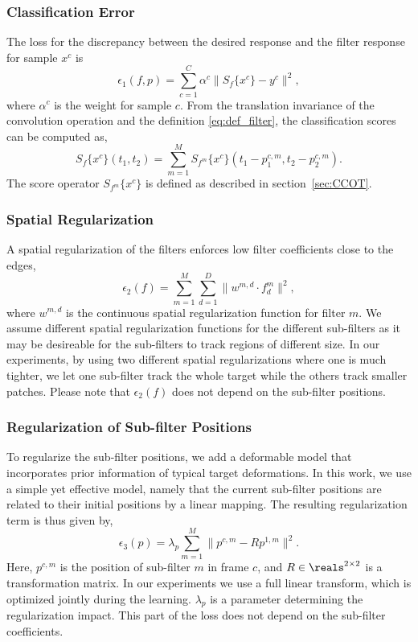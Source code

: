 \documentclass[runningheads,a4paper]{llncs}
\begin{document}
\subsubsection{Classification Error}
The loss for the discrepancy between the desired response and the filter response for sample $x^c$ is
\begin{equation}
  \epsilon_1(f,p) = \sum_{c=1}^C\alpha^c\|S_f\{x^c\} - y^c\|^2 ,
\end{equation}
where $\alpha^c$ is the weight for sample $c$. From the translation invariance of the convolution operation and the definition \eqref{eq:def_filter}, the classification scores can be computed as, 
\begin{equation}
S_f\{x^{c}\}(t_1,t_2) = \sum_{m=1}^M S_{f^m}\{x^{c}\}(t_1-p_1^{c,m},t_2-p_2^{c,m}).
\end{equation}
The score operator $S_{f^m}\{x^c\}$ is defined as described in section~\ref{sec:CCOT}.

\subsubsection{Spatial Regularization}
A spatial regularization of the filters enforces low filter coefficients close to the edges,
\begin{equation}
  \epsilon_2(f) = \sum_{m=1}^M\sum_{d=1}^D\|w^{m,d}\cdot f_d^m\|^2,
\end{equation}
where $w^{m,d}$ is the continuous spatial regularization function for filter $m$. We assume different spatial regularization functions for the different sub-filters as it may be desireable for the sub-filters to track regions of different size. In our experiments, by using two different spatial regularizations where one is much tighter, we let one sub-filter track the whole target while the others track smaller patches. Please note that $\epsilon_2(f)$ does not depend on the sub-filter positions.

\subsubsection{Regularization of Sub-filter Positions}
To regularize the sub-filter positions, we add a deformable model that incorporates prior information of typical target deformations. In this work, we use a simple yet effective model, namely that the current sub-filter positions are related to their initial positions by a linear mapping. The resulting regularization term is thus given by,
\begin{equation}
  \epsilon_3(p) = \lambda_p\sum_{m=1}^M\|p^{c,m} - Rp^{1,m}\|^2 .
\end{equation}
Here, $p^{c,m}$ is the position of sub-filter $m$ in frame $c$, and $R\in\reals^{2\times2}$ is a transformation matrix. In our experiments we use a full linear transform, which is optimized jointly during the learning. $\lambda_p$ is a parameter determining the regularization impact. This part of the loss does not depend on the sub-filter coefficients.
\end{document}
